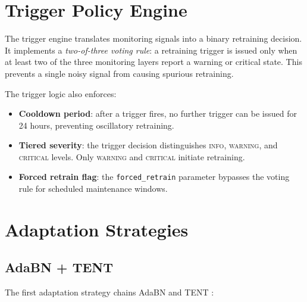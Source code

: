 \section{Trigger Policy Engine}
\label{sec:trigger}

The trigger engine translates monitoring signals into a binary retraining
decision.
It implements a \textit{two-of-three voting rule}: a retraining trigger is
issued only when at least two of the three monitoring layers report a warning
or critical state.
This prevents a single noisy signal from causing spurious retraining.

The trigger logic also enforces:
\begin{itemize}
  \item \textbf{Cooldown period}: after a trigger fires, no further trigger
        can be issued for 24 hours, preventing oscillatory retraining.
  \item \textbf{Tiered severity}: the trigger decision distinguishes
        \textsc{info}, \textsc{warning}, and \textsc{critical} levels.
        Only \textsc{warning} and \textsc{critical} initiate retraining.
  \item \textbf{Forced retrain flag}: the \texttt{forced\_retrain} parameter
        bypasses the voting rule for scheduled maintenance windows.
\end{itemize}

\section{Adaptation Strategies}
\label{sec:adaptation}

\subsection{AdaBN + TENT}
\label{sec:tent_adabn}

The first adaptation strategy chains AdaBN \citep{li2018adabn} and TENT
\citep{wang2021tent}:

